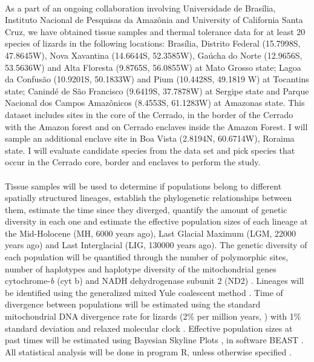 \documentclass{article}
\begin{document}
{\paragraph{} As a part of an ongoing collaboration involving Universidade de Brasília, Instituto Nacional de Pesquisas da Amazônia and University of California Santa Cruz, we have obtained tissue samples and thermal tolerance data for at least 20 species of lizards in the following locations: Brasília, Distrito Federal (15.7998\degree S, 47.8645\degree W), Nova Xavantina (14.6644\degree S, 52.3585\degree W), Gaúcha do Norte (12.9656\degree S, 53.5636\degree W) and Alta Floresta (9.8765\degree S, 56.0855\degree W) at Mato Grosso state; Lagoa da Confusão (10.9201\degree S, 50.1833\degree W) and Pium (10.4428\degree S, 49.1819 \degree W) at Tocantins state; Canindé de São Francisco (9.6419\degree S, 37.7878\degree W) at Sergipe state and Parque Nacional dos Campos Amazônicos (8.4553\degree S, 61.1283\degree W) at Amazonas state. This dataset includes sites in the core of the Cerrado, in the border of the Cerrado with the Amazon forest and on Cerrado enclaves inside the Amazon Forest. I will sample an additional enclave site in Boa Vista (2.8194\degree N, 60.6714\degree W), Roraima state. I will evaluate candidate species from the data set and pick species that occur in the Cerrado core, border and enclaves to perform the study.

\paragraph{} Tissue samples will be used to determine if populations belong to different spatially structured lineages, establish the phylogenetic relationships between them, estimate the time since they diverged, quantify the amount of genetic diversity in each one and estimate the effective population sizes of each lineage at the Mid-Holocene (MH, 6000 years ago), Last Glacial Maximum (LGM, 22000 years ago) and Last Interglacial (LIG, 130000 years ago). The genetic diversity of each population will be quantified through the number of polymorphic sites, number of haplotypes and haplotype diversity of the mitochondrial genes cytochrome-\textit{b} (cyt b) and NADH dehydrogenase subunit 2 (ND2) \cite{santos2014landscape}. Lineages will be identified using the generalized mixed Yule coalescent method \cite{pons2006sequence}. Time of divergence between populations will be estimated using the standard mitochondrial DNA divergence rate for lizards (2\% per million years, \cite{thorpe2005molecular}) with 1\% standard deviation and relaxed molecular clock \cite{santos2014landscape}. Effective population sizes at past times will be estimated using Bayesian Skyline Plots \cite{drummond2005bayesian}, in software BEAST \cite{bouckaert2014beast}. All statistical analysis will be done in program R, unless otherwise specified \cite{r2018}.

}
\end{document}

